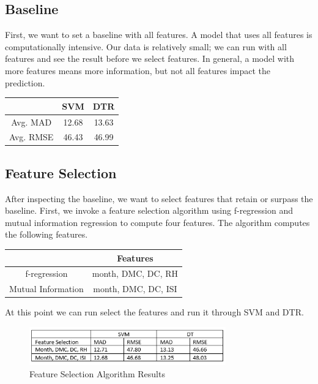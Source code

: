 \documentclass[conference]{IEEEtran}
\begin{document}
\subsection{Baseline}
First, we want to set a baseline with all features. A model that uses all features is computationally intensive. Our data is relatively small; we can run with all features and see the result before we select features. In general, a model with more features means more information, but not all features impact the prediction. 
\begin{center}
\begin{tabular}{ |c|c|c| } 
 \hline
  & SVM & DTR \\ 
 \hline
 Avg. MAD & 12.68 & 13.63 \\ 
 \hline
 Avg. RMSE & 46.43 & 46.99 \\ 
 \hline
\end{tabular}
\end{center}

\subsection{Feature Selection}
After inspecting the baseline, we want to select features that retain or surpass the baseline. First, we invoke a feature selection algorithm using f-regression and mutual information regression to compute four features. The algorithm computes the following features.

\begin{center}
\begin{tabular}{ |c|c| } 
\hline
 & Features \\ 
\hline
f-regression &  month, DMC, DC, RH\\ 
\hline
Mutual Information & month, DMC, DC, ISI\\ 
\hline
\end{tabular}
\end{center}

At this point we can run select the features and run it through SVM and DTR.
\begin{center}
    \begin{figure}[H]
        \centering
        \includegraphics[width=8.5cm]{feature_selection.PNG}
        \caption{Feature Selection Algorithm Results}
        \label{fig:feature_selection_algorithm_results}
    \end{figure}
\end{center}
\end{document}
